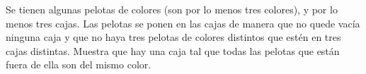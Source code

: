Se tienen algunas pelotas de colores (son por lo menos tres colores), y por lo menos tres cajas. Las pelotas se ponen en las cajas de manera que no quede vacía ninguna caja y que no haya tres pelotas de colores distintos que estén en tres cajas distintas. Muestra que hay una caja tal que todas las pelotas que están fuera de ella son del mismo color.